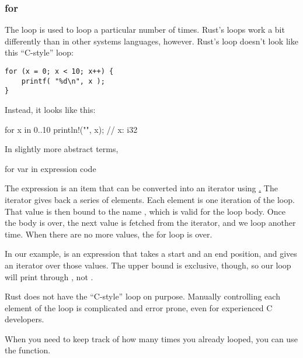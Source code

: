 \subsubsection*{for}

The  loop is used to loop a particular number of times. Rust's  loops work a bit differently than in other 
systems languages, however. Rust's  loop doesn't look like this “C-style”  loop:

\begin{verbatim}
for (x = 0; x < 10; x++) {
    printf( "%d\n", x );
}
\end{verbatim}

Instead, it looks like this:

\begin{rustc}
for x in 0..10 {
    println!("{}", x); // x: i32
}
\end{rustc}

In slightly more abstract terms,

\begin{rustc}
for var in expression {
    code
}
\end{rustc}

The expression is an item that can be converted into an iterator using 
\href{https://doc.rust-lang.org/std/iter/trait.IntoIterator.html\{IntoIterator}. The iterator gives back a series of elements. Each 
element is one iteration of the loop. That value is then bound to the name , which is valid for the loop body. Once the 
body is over, the next value is fetched from the iterator, and we loop another time. When there are no more values, the for loop is 
over.

\blank

In our example,  is an expression that takes a start and an end position, and gives an iterator over those values. 
The upper bound is exclusive, though, so our loop will print  through , not .

\blank

Rust does not have the “C-style”  loop on purpose. Manually controlling each element of the loop is complicated and 
error prone, even for experienced C developers.


When you need to keep track of how many times you already looped, you can use the  function.


